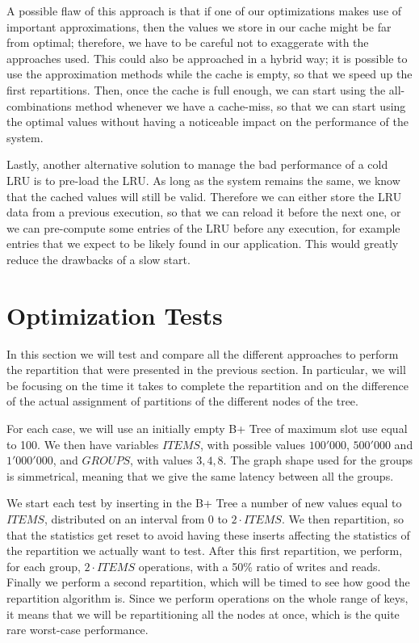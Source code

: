 A possible flaw of this approach is that if one of our optimizations makes use of important approximations, then the values we store in our cache might be far from optimal; therefore, we have to be careful not to exaggerate with the approaches used. This could also be approached in a hybrid way; it is possible to use the approximation methods while the cache is empty, so that we speed up the first repartitions. Then, once the cache is full enough, we can start using the all-combinations method whenever we have a cache-miss, so that we can start using the optimal values without having a noticeable impact on the performance of the system.

Lastly, another alternative solution to manage the bad performance of a cold LRU is to pre-load the LRU. As long as the system remains the same, we know that the cached values will still be valid. Therefore we can either store the LRU data from a previous execution, so that we can reload it before the next one, or we can pre-compute some entries of the LRU before any execution, for example entries that we expect to be likely found in our application. This would greatly reduce the drawbacks of a slow start.

\section{Optimization Tests}\label{sec:optimization-tests}
In this section we will test and compare all the different approaches to perform the repartition that were presented in the previous section. 
In particular, we will be focusing on the time it takes to complete the repartition and on the difference of the actual assignment of partitions of the different nodes of the tree.

For each case, we will use an initially empty B+ Tree of maximum slot use equal to 100. We then have variables $ITEMS$, with possible values $100'000$, $500'000$ and $1'000'000$, and $GROUPS$, with values $3, 4, 8$. The graph shape used for the groups is simmetrical, meaning that we give the same latency between all the groups.

We start each test by inserting in the B+ Tree a number of new values equal to $ITEMS$, distributed on an interval from 0 to $2\cdot ITEMS$. We then repartition, so that the statistics get reset to avoid having these inserts affecting the statistics of the repartition we actually want to test. After this first repartition, we perform, for each group, $2\cdot ITEMS$ operations, with a 50\% ratio of writes and reads. Finally we perform a second repartition, which will be timed to see how good the repartition algorithm is. Since we perform operations on the whole range of keys, it means that we will be repartitioning all the nodes at once, which is the quite rare worst-case performance.

